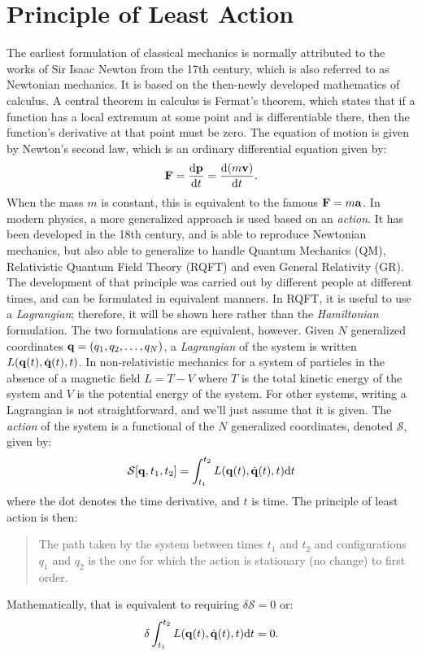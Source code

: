 \section{Principle of Least Action}
\label{sec:least-action}
The earliest formulation of classical mechanics is normally attributed to the works of Sir Isaac Newton from the 17th century, which is also referred to as Newtonian mechanics. It is based on the then-newly developed mathematics of calculus. A central theorem in calculus is Fermat's theorem, which states that if a function has a local extremum at some point and is differentiable there, then the function's derivative at that point must be zero. The equation of motion is given by Newton's second law, which is an ordinary differential equation given by:
\begin{equation}
\vb{F}=\dv{\vb{p}}{t}=\dv{(m\vb{v})}{t}.
\label{eq:newton-second-law}
\end{equation}
When the mass $m$ is constant, this is equivalent to the famous $\vb{F}=m\vb{a}$. In modern physics, a more generalized approach is used based on an \emph{action}. It has been developed in the 18th century, and is able to reproduce Newtonian mechanics, but also able to generalize to handle Quantum Mechanics (QM), Relativistic Quantum Field Theory (RQFT) and even General Relativity (GR). The development of that principle was carried out by different people at different times, and can be formulated in equivalent manners. In RQFT, it is useful to use a \emph{Lagrangian}; therefore, it will be shown here rather than the \emph{Hamiltonian} formulation. The two formulations are equivalent, however. Given $N$ generalized coordinates $\vb{q}=\qty(q_1,q_2,\ldots,q_N)$, a \emph{Lagrangian} of the system is written $L\qty( \vb{q}\qty(t), \dot{\vb{q}}\qty(t), t )$. In non-relativistic mechanics for a system of particles in the absence of a magnetic field  $L=T-V$ where $T$ is the total kinetic energy of the system and $V$ is the potential energy of the system. For other systems, writing a Lagrangian is not straightforward, and we'll just assume that it is given. The \emph{action} of the system is a functional of the $N$ generalized coordinates, denoted $\mathcal{S}$, given by:
\begin{equation}
\mathcal{S}\qty[ \vb{q}, t_1, t_2 ] = \int^{t_2}_{t_1} L\qty( \vb{q}\qty(t), \dot{\vb{q}}\qty(t), t ) \dd t
\end{equation}
where the dot denotes the time derivative, and $t$ is time. The principle of least action is then:
\begin{quote}
The path taken by the system between times $t_1$ and $t_2$ and configurations $q_1$ and $q_2$ is the one for which the action is stationary (no change) to first order.
\end{quote}
Mathematically, that is equivalent to requiring $\delta \mathcal{S}=0$ or:
\begin{equation}
\delta \int^{t_2}_{t_1} L\qty( \vb{q}\qty(t), \dot{\vb{q}}\qty(t), t ) \dd t = 0.
\label{eq:principle-of-least-action}
\end{equation}

